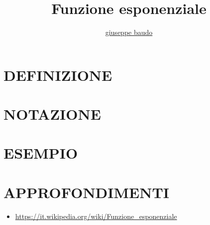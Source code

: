\documentclass[a4paper,10pt]{article}
\title{Funzione esponenziale}
\author{\href{http://www.baudo.hol.es}{giuseppe baudo}}
\begin{document}
\maketitle

\section{DEFINIZIONE}

\section{NOTAZIONE}

\section{ESEMPIO}

\section{APPROFONDIMENTI}
\begin{itemize}
 \item \href{https://it.wikipedia.org/wiki/Funzione_esponenziale}{https://it.wikipedia.org/wiki/Funzione_esponenziale}
\end{itemize}
\end{document}
